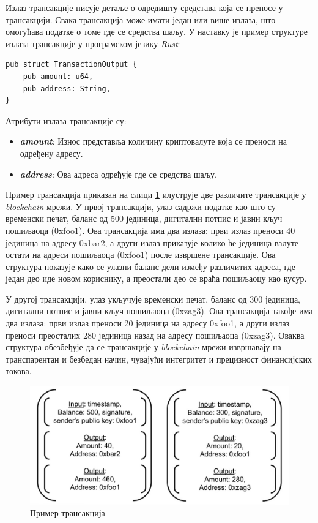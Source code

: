 \documentclass[12pt, a4paper]{article}
\begin{document}
Излаз трансакције писује детаље о одредишту средстава која се преносе у трансакцији. Свака трансакција може имати један или више излаза, што омогућава податке о томе где се средства шаљу. У наставку је пример структуре излаза трансакције у програмском језику \textit{Rust}:

\begin{verbatim}
pub struct TransactionOutput {
    pub amount: u64,
    pub address: String,
}
\end{verbatim}

Атрибути излаза трансакције су:
\begin{itemize}
    \item \textbf{\textit{amount}}: Износ представља количину криптовалуте која се преноси на одређену адресу.
    \item \textbf{\textit{address}}: Ова адреса одређује где се средства шаљу.
\end{itemize}

Пример трансакција приказан на слици \ref{fig:transactions-example} илуструје две различите трансакције у \textit{blockchain} мрежи. У првој трансакцији, улаз садржи податке као што су временски печат, баланс од 500 јединица, дигитални потпис и јавни кључ пошиљаоца (0xfoo1). Ова трансакција има два излаза: први излаз преноси 40 јединица на адресу 0xbar2, а други излаз приказује колико ће јединица валуте остати на адреси пошиљаоца (0xfoo1) после извршене трансакције. Ова структура показује како се улазни баланс дели између различитих адреса, где један део иде новом кориснику, а преостали део се враћа пошиљаоцу као кусур.

У другој трансакцији, улаз укључује временски печат, баланс од 300 јединица, дигитални потпис и јавни кључ пошиљаоца (0xzag3). Ова трансакција такође има два излаза: први излаз преноси 20 јединица на адресу 0xfoo1, а други излаз преноси преосталих 280 јединица назад на адресу пошиљаоца (0xzag3). Оваква структура обезбеђује да се трансакције у \textit{blockchain} мрежи извршавају на транспарентан и безбедан начин, чувајући интегритет и прецизност финансијских токова.


\begin{figure}[h]
    \centering
    \includegraphics[width=1\linewidth]{slike/transactions-example.png}
    \caption{Пример трансакција}
    \label{fig:transactions-example}
\end{figure}
\end{document}
